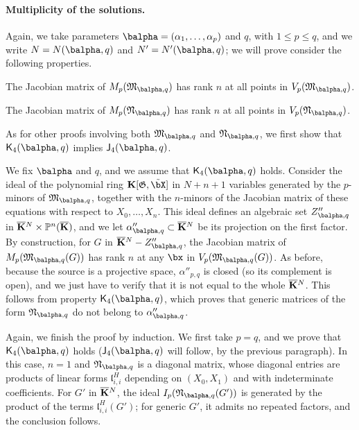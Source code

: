 \documentclass[12pt]{article}
\begin{document}
\paragraph{Multiplicity of the solutions.} 
Again, we take parameters $\balpha=(\alpha_1,\dots,\alpha_p)$ and $q$, with $1 \le p
\le q$, and we write $N=N(\balpha,q)$ and $N'=N'(\balpha,q)$; we will prove
consider the following properties.
\begin{description}[leftmargin=*]
\item[$\assI_4(\balpha,q).$] The Jacobian matrix of
  $M_p(\mathfrak{M}_{\balpha,q})$ has rank $n$ at all points in
  $V_p(\mathfrak{M}_{\balpha,q})$.
\item[$\assJ_4(\balpha,q).$] The Jacobian matrix of
  $M_p(\mathfrak{N}_{\balpha,q})$ has rank $n$ at all points in
  $V_p(\mathfrak{N}_{\balpha,q})$.
\end{description}
As for other proofs involving both $\mathfrak{M}_{\balpha,q}$ and
$\mathfrak{N}_{\balpha,q}$, we first show that $\assJ_4(\balpha,q)$ implies
$\assI_4(\balpha,q)$.

We fix $\balpha$ and $q$, and we assume that $\assJ_4(\balpha,q)$
holds. Consider the ideal of the polynomial ring
$\KK[\mathfrak{G},\tilde\bX]$ in $N+n+1$ variables generated by the
$p$-minors of $\mathfrak{M}_{\balpha,q}$, together with the $n$-minors of
the Jacobian matrix of these equations with respect to
$X_0,\dots,X_n$. This ideal defines an algebraic set $Z''_{\balpha,q}$ in
$\overline{\mathbf{K}}{}^N \times \mathbb{P}^n(\overline{\mathbf{K}})$, and we let $\alpha''_{\balpha,q} \subset
\KKbar{}^N$ be its projection on the first factor. By construction,
for $G$ in $\KKbar{}^N-Z''_{\balpha,q}$, the Jacobian matrix of
$M_p(\mathfrak{M}_{\balpha,q}(G))$ has rank $n$ at any $\bx$ in
$V_p(\mathfrak{M}_{\balpha,q}(G))$. As before, because the source is a
projective space, $\alpha''_{p,q}$ is closed (so its complement is
open), and we just have to verify that it is not equal to the whole
$\overline{\mathbf{K}}{}^N$. This follows from property $\assJ_4(\balpha,q)$, which
proves that generic matrices of the form $\mathfrak{N}_{\balpha,q}$ do not
belong to $\alpha''_{\balpha,q}$.

Again, we finish the proof by induction. We first take $p=q$, and we
prove that $\assJ_4(\balpha,q)$ holds ($\assI_4(\balpha,q)$ will follow,
by the previous paragraph). In this case, $n=1$ and
$\mathfrak{N}_{\balpha,q}$ is a diagonal matrix, whose diagonal entries
are products of linear forms $\mathfrak{l}^H_{i,i}$ depending on
$(X_0,X_1)$ and with indeterminate coefficients. For $G'$ in
$\overline{\mathbf{K}}{}^N$, the ideal $I_p(\mathfrak{N}_{\balpha,q}(G'))$ is generated by
the product of the terms $\mathfrak{l}^H_{i,i}(G')$; for generic $G'$, it
admits no repeated factors, and the conclusion follows.
\end{document}
